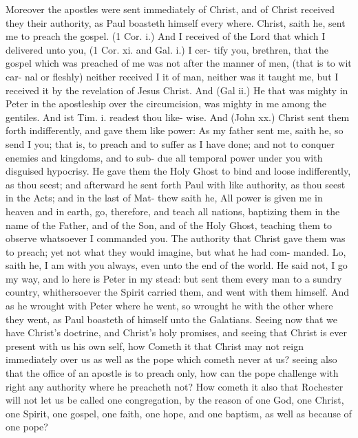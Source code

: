 \documentclass{custom}
\begin{document}
Moreover the apostles were sent immediately of Christ, 
and of Christ received they their authority, as Paul boasteth 
himself every where. Christ, saith he, sent me to preach 
the gospel. (1 Cor. i.) And I received of the Lord that 
which I delivered unto you, (1 Cor. xi. and Gal. i.) I cer- 
tify you, brethren, that the gospel which was preached of 
me was not after the manner of men, (that is to wit car- 
nal or fleshly) neither received I it of man, neither was 
it taught me, but I received it by the revelation of Jesus 
Christ. And (Gal ii.) He that was mighty in Peter in the 
apostleship over the circumcision, was mighty in me 
among the gentiles. And ist Tim. i. readest thou like- 
wise. And (John xx.) Christ sent them forth indifferently, 
and gave them like power: As my father sent me, saith he, 
so send I you; that is, to preach and to suffer as I have 
done; and not to conquer enemies and kingdoms, and to sub- 
due all temporal power under you with disguised hypocrisy. 
He gave them the Holy Ghost to bind and loose indifferently, 
as thou seest; and afterward he sent forth Paul with like 
authority, as thou seest in the Acts; and in the last of Mat- 
thew saith he, All power is given me in heaven and in 
earth, go, therefore, and teach all nations, baptizing them in 
the name of the Father, and of the Son, and of the Holy 
Ghost, teaching them to observe whatsoever I commanded 
you. The authority that Christ gave them was to preach; 
yet not what they would imagine, but what he had com- 
manded. Lo, saith he, I am with you always, even unto 
the end of the world. He said not, I go my way, and lo here 
is Peter in my stead: but sent them every man to a sundry 
country, whithersoever the Spirit carried them, and went 
with them himself. And as he wrought with Peter where 
he went, so wrought he with the other where they went, 
as Paul boasteth of himself unto the Galatians. Seeing now 
that we have Christ's doctrine, and Christ's holy promises, 
and seeing that Christ is ever present with us his own self, 
how Cometh it that Christ may not reign immediately over 
us as well as the pope which cometh never at us? seeing 
also that the office of an apostle is to preach only, how can 
the pope challenge with right any authority where he 
preacheth not? How cometh it also that Rochester will 
not let us be called one congregation, by the reason of one 
God, one Christ, one Spirit, one gospel, one faith, one 
hope, and one baptism, as well as because of one pope? 
\end{document}
